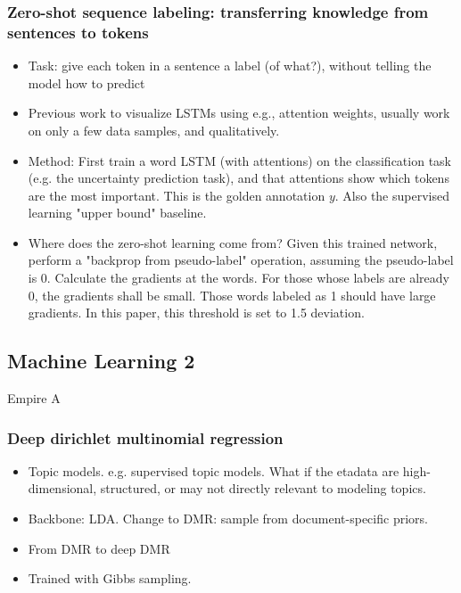 \subsubsection{\cite{Rei2018Zero-Shot} Zero-shot sequence labeling: transferring knowledge from sentences to tokens}
\begin{itemize}
	\item Task: give each token in a sentence a label (of what?), without telling the model how to predict
	\item Previous work to visualize LSTMs using e.g., attention weights, usually work on only a few data samples, and qualitatively.
	\item Method: First train a word LSTM (with attentions) on the classification task (e.g. the uncertainty prediction task), and that attentions show which tokens are the most important. This is the golden annotation $y$. Also the supervised learning "upper bound" baseline.
	\item Where does the zero-shot learning come from? Given this trained network, perform a "backprop from pseudo-label" operation, assuming the pseudo-label is 0. Calculate the gradients at the words. For those whose labels are already 0, the gradients shall be small. Those words labeled as 1 should have large gradients. In this paper, this threshold is set to 1.5 deviation.
\end{itemize}




\subsection{Machine Learning 2}
Empire A
\subsubsection{\cite{Benton2018Deep} Deep dirichlet multinomial regression}
\begin{itemize}
	\item Topic models. e.g. supervised topic models. What if the etadata are high-dimensional, structured, or may not directly relevant to modeling topics.
	\item Backbone: LDA. Change to DMR: sample from document-specific priors. 
	\item From DMR to deep DMR
	\item Trained with Gibbs sampling.
\end{itemize}

